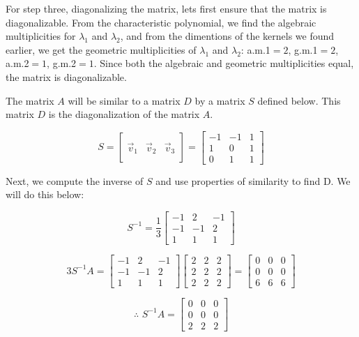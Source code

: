 \documentclass[11pt]{article}
\begin{document}
For step three, diagonalizing the matrix, lets first ensure that the matrix is diagonalizable. From the characteristic polynomial, we find the algebraic multiplicities for $\lambda_1$ and $\lambda_2$, and from the dimentions of the kernels we found earlier, we get the geometric multiplicities of $\lambda_1$ and $\lambda_2$: a.m.1$=2$, g.m.1$=2$, a.m.2$=1$, g.m.2$=1$. Since both the algebraic and geometric multiplicities equal, the matrix is diagonalizable.

The matrix $A$ will be similar to a matrix $D$ by a matrix $S$ defined below. This matrix $D$ is the diagonalization of the matrix $A$.

$$S=\begin{bmatrix} & & \\\vec{v}_1 & \vec{v}_2 & \vec{v}_3\\ & & \end{bmatrix}=
\begin{bmatrix}-1 & -1 & 1\\1 & 0 & 1\\0 & 1 & 1\end{bmatrix}$$

Next, we compute the inverse of $S$ and use properties of similarity to find D. We will do this below:

$$S^{-1}=\frac{1}{3}\begin{bmatrix}-1 & 2 & -1\\-1 & -1 & 2\\1 & 1 & 1\end{bmatrix}$$

$$3S^{-1}A=\begin{bmatrix}-1 & 2 & -1\\-1 & -1 & 2\\1 & 1 & 1\end{bmatrix}\begin{bmatrix}2 & 2 & 2\\2 & 2 & 2\\2 & 2 & 2\end{bmatrix}=\begin{bmatrix}0 & 0 & 0\\0 & 0 & 0\\6 & 6 & 6\end{bmatrix}$$

$$\therefore\,\, S^{-1}A=\begin{bmatrix}0 & 0 & 0\\0 & 0 & 0\\2 & 2 & 2\end{bmatrix}$$
\end{document}
